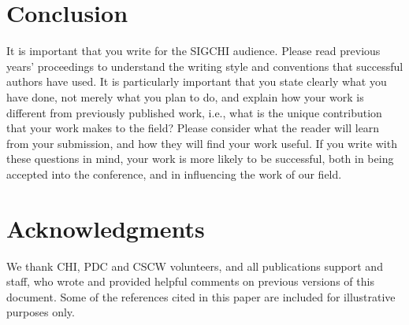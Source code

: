 \documentclass[preprint]{../latex/sigchi-modern}
\begin{document}
\section{Conclusion}
It is important that you write for the SIGCHI audience. Please read previous
years' proceedings to understand the writing style and conventions that
successful authors have used.  It is particularly important that you state
clearly what you have done, not merely what you plan to do, and explain how your
work is different from previously published work, i.e., what is the unique
contribution that your work makes to the field?  Please consider what the reader
will learn from your submission, and how they will find your work useful. If you
write with these questions in mind, your work is more likely to be successful,
both in being accepted into the conference, and in influencing the work of our
field.

\section{Acknowledgments}
We thank CHI, PDC and CSCW volunteers, and all publications support and staff,
who wrote and provided helpful comments on previous versions of this document.
Some of the references cited in this paper are included for illustrative
purposes only.


\end{document}
